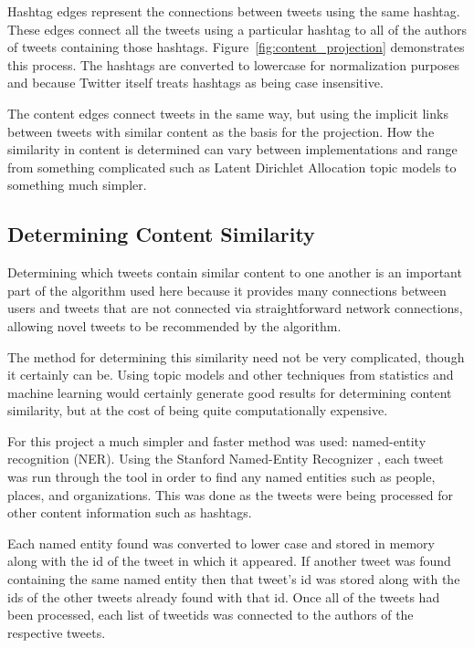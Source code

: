 Hashtag edges represent the connections between tweets using the same hashtag. These edges connect all the tweets using a particular hashtag to all of the authors of tweets containing those hashtags. Figure~\ref{fig:content_projection} demonstrates this process. The hashtags are converted to lowercase for normalization purposes and because Twitter itself treats hashtags as being case insensitive.

The content edges connect tweets in the same way, but using the implicit links between tweets with similar content as the basis for the projection. How the similarity in content is determined can vary between implementations and range from something complicated such as Latent Dirichlet Allocation topic models to something much simpler.

\subsection{Determining Content Similarity}
\label{sec:DeterminingContentSimilarity}

Determining which tweets contain similar content to one another is an important part of the algorithm used here because it provides many connections between users and tweets that are not connected via straightforward network connections, allowing novel tweets to be recommended by the algorithm.

The method for determining this similarity need not be very complicated, though it certainly can be. Using topic models and other techniques from statistics and machine learning would certainly generate good results for determining content similarity, but at the cost of being quite computationally expensive.

For this project a much simpler and faster method was used: named-entity recognition (NER). Using the Stanford Named-Entity Recognizer \cite{Finkel2005}, each tweet was run through the tool in order to find any named entities such as people, places, and organizations. This was done as the tweets were being processed for other content information such as hashtags.

Each named entity found was converted to lower case and stored in memory along with the id of the tweet in which it appeared. If another tweet was found containing the same named entity then that tweet's id was stored along with the ids of the other tweets already found with that id. Once all of the tweets had been processed, each list of tweetids was connected to the authors of the respective tweets.

